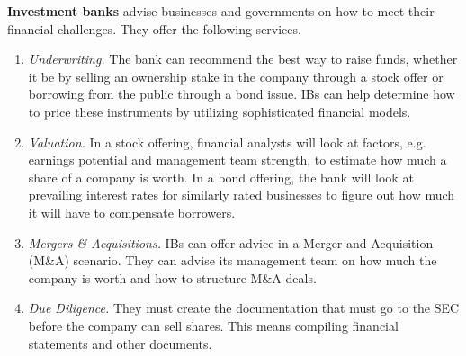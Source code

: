 \documentclass{article}
\begin{document}
    \begin{definition}
      \label{def:investment-banks}
      \textbf{Investment banks} advise businesses and governments on how to meet their financial challenges. They offer the following services. 
      \begin{enumerate}
        \item \textit{Underwriting. }The bank can recommend the best way to raise funds, whether it be by selling an ownership stake in the company through a stock offer or borrowing from the public through a bond issue. IBs can help determine how to price these instruments by utilizing sophisticated financial models. 
        \item \textit{Valuation. }In a stock offering, financial analysts will look at factors, e.g. earnings potential and management team strength, to estimate how much a share of a company is worth. In a bond offering, the bank will look at prevailing interest rates for similarly rated businesses to figure out how much it will have to compensate borrowers. 
        \item \textit{Mergers \& Acquisitions. }IBs can offer advice in a Merger and Acquisition (M\&A) scenario. They can advise its management team on how much the company is worth and how to structure M\&A deals. 
        \item \textit{Due Diligence. }They must create the documentation that must go to the SEC before the company can sell shares. This means compiling financial statements and other documents. 
      \end{enumerate}
    \end{definition}
\end{document}
